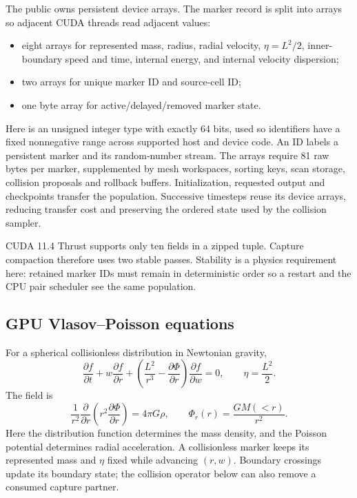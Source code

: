 The public  owns persistent device arrays.  The
marker record is split into arrays so adjacent CUDA threads read adjacent
values:
\begin{itemize}
\item eight  arrays for represented mass, radius, radial
velocity, \(\eta=L^2/2\), inner-boundary speed and time, internal energy, and
internal velocity dispersion;
\item two  arrays for unique marker ID and source-cell ID;
\item one byte array for active/delayed/removed marker state.
\end{itemize}
Here  is an unsigned integer type with exactly 64 bits, used so
identifiers have a fixed nonnegative range across supported host and device
code. An ID labels a persistent marker and its random-number stream.
The arrays require 81 raw bytes per marker, supplemented by mesh workspaces,
sorting keys, scan storage, collision proposals and rollback buffers.
Initialization, requested output and checkpoints transfer the population.
Successive timesteps reuse its device arrays, reducing transfer cost and
preserving the ordered state used by the collision sampler.

CUDA 11.4 Thrust supports only ten fields in a zipped tuple.  Capture
compaction therefore uses two stable  passes.  Stability is a
physics requirement here: retained marker IDs must remain in deterministic
order so a restart and the CPU pair scheduler see the same population.

\subsection{GPU Vlasov--Poisson equations}

For a spherical collisionless distribution in Newtonian gravity,
\begin{equation}
 \frac{\partial f}{\partial t}
 +w\frac{\partial f}{\partial r}
 +\left(\frac{L^2}{r^3}-\frac{\partial\Phi}{\partial r}\right)
  \frac{\partial f}{\partial w}=0,
 \qquad \eta=\frac{L^2}{2}.
\end{equation}
The field is
\begin{equation}
 \frac{1}{r^2}\frac{\partial}{\partial r}
 \left(r^2\frac{\partial\Phi}{\partial r}\right)=4\pi G\rho,
 \qquad
 \Phi_r(r)=\frac{GM(<r)}{r^2}.
\end{equation}
Here the distribution function determines the mass density, and the Poisson
potential determines radial acceleration. A collisionless marker keeps its
represented mass and \(\eta\) fixed while advancing \((r,w)\). Boundary
crossings update its boundary state; the collision operator below can also
remove a consumed capture partner.

